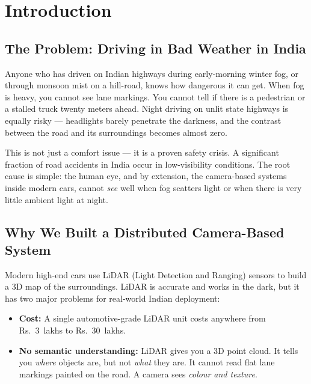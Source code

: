 \documentclass[12pt, a4paper]{article}
\begin{document}
\tableofcontents
\newpage

\section{Introduction}

\subsection{The Problem: Driving in Bad Weather in India}

Anyone who has driven on Indian highways during early-morning winter fog,
or through monsoon mist on a hill-road, knows how dangerous it can get.
When fog is heavy, you cannot see lane markings. You cannot tell if there is
a pedestrian or a stalled truck twenty meters ahead. Night driving on
unlit state highways is equally risky — headlights barely penetrate the
darkness, and the contrast between the road and its surroundings becomes
almost zero.

This is not just a comfort issue — it is a proven safety crisis. A significant
fraction of road accidents in India occur in low-visibility conditions. The root cause is simple:
the human eye, and by extension, the camera-based systems inside modern cars,
cannot \textit{see} well when fog scatters light or when there is very little
ambient light at night.

\subsection{Why We Built a Distributed Camera-Based System}

Modern high-end cars use LiDAR (Light Detection and Ranging) sensors to build
a 3D map of the surroundings. LiDAR is accurate and works in the dark, but it
has two major problems for real-world Indian deployment:

\begin{itemize}
  \item \textbf{Cost:} A single automotive-grade LiDAR unit costs anywhere from
  Rs.~3~lakhs to Rs.~30~lakhs.
  \item \textbf{No semantic understanding:} LiDAR gives you a 3D point cloud.
  It tells you \textit{where} objects are, but not \textit{what} they are. It
  cannot read flat lane markings painted on the road. A camera sees \textit{colour and texture}.
\end{itemize}
\end{document}
